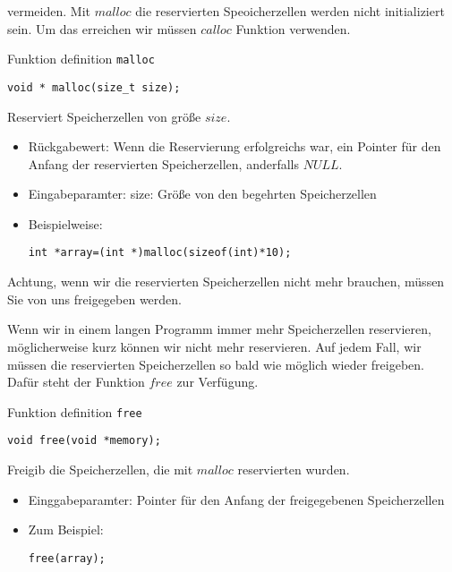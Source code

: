 vermeiden. Mit $malloc$ die reservierten Speoicherzellen werden nicht initializiert sein. Um das 
erreichen wir müssen $calloc$ Funktion verwenden.
\begin{myexampleblock}{Funktion definition \texttt{malloc}}
\begin{lstlisting}
void * malloc(size_t size);
\end{lstlisting}
\vspace{-0.7cm}
Reserviert Speicherzellen von größe $size$.
\begin{itemize}
\itemsep0.2pt
\item Rückgabewert: Wenn die Reservierung erfolgreichs war, ein Pointer für den Anfang der 
reservierten Speicherzellen, anderfalls $NULL$.
\item Eingabeparamter: size: Größe von den begehrten Speicherzellen
\item Beispielweise:
\begin{lstlisting}
int *array=(int *)malloc(sizeof(int)*10);
\end{lstlisting}
\end{itemize}
\vspace{-0.7cm}
Achtung, wenn wir die reservierten Speicherzellen nicht mehr brauchen, müssen Sie 
von uns freigegeben werden.
\end{myexampleblock}
Wenn wir in einem langen Programm immer mehr Speicherzellen reservieren, 
möglicherweise kurz können wir nicht mehr reservieren. Auf jedem Fall, wir müssen
die reservierten Speicherzellen so bald wie möglich wieder freigeben. Dafür steht
der Funktion $free$ zur Verfügung.
\begin{myexampleblock}{Funktion definition \texttt{free}}
\begin{lstlisting}
void free(void *memory);
\end{lstlisting}
\vspace{-0.7cm}
Freigib die Speicherzellen, die mit $malloc$ reservierten wurden.
\begin{itemize}
\item Einggabeparamter: Pointer für den Anfang der freigegebenen Speicherzellen
\item Zum Beispiel:
\begin{lstlisting}
free(array);
\end{lstlisting}
\end{itemize}
\vspace{-0.7cm}
\end{myexampleblock}

